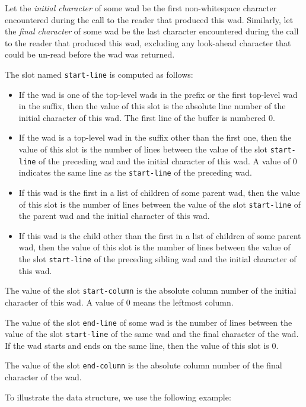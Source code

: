 Let the \emph{initial character} of some wad be the first
non-whitespace character encountered during the call to the reader
that produced this wad.  Similarly, let the \emph{final
  character} of some wad be the last character encountered
during the call to the reader that produced this wad,
excluding any look-ahead character that could be un-read before the
wad was returned.

The slot named \texttt{start-line} is computed as follows:

\begin{itemize}
\item If the wad is one of the top-level wads in the
  prefix or the first top-level wad in the suffix, then the
  value of this slot is the absolute line number of the initial
  character of this wad.  The first line of the buffer is
  numbered $0$.
\item If the wad is a top-level wad in the suffix other than the first
  one, then the value of this slot is the number of lines between the
  value of the slot \texttt{start-line} of the preceding wad and the
  initial character of this wad.  A value of $0$ indicates the same
  line as the \texttt{start-line} of the preceding wad.
\item If this wad is the first in a list of children of some
  parent wad, then the value of this slot is the number of
  lines between the value of the slot \texttt{start-line} of the parent
  wad and the initial character of this wad.
\item If this wad is the child other than the first in a list
  of children of some parent wad, then the value of this slot
  is the number of lines between the value of the slot
  \texttt{start-line} of the preceding sibling wad and the
  initial character of this wad.
\end{itemize}

The value of the slot \texttt{start-column} is the absolute column
number of the initial character of this wad.  A value of $0$
means the leftmost column.

The value of the slot \texttt{end-line} of some wad is the
number of lines between the value of the slot \texttt{start-line} of
the same wad and the final character of the wad.
If the wad starts and ends on the same line, then the value
of this slot is $0$.

The value of the slot \texttt{end-column} is the absolute column
number of the final character of the wad.

To illustrate the data structure, we use the following example:

